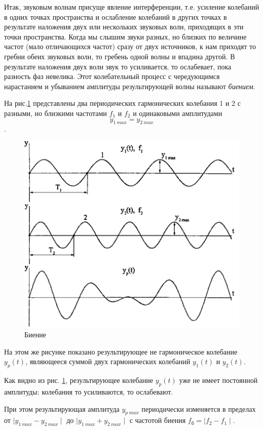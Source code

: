 \documentclass[oneside, final, 14pt]{extreport}
\begin{document}
Итак, звуковым волнам присуще явление интерференции, т.е. усиление колебаний в одних точках пространства и ослабление колебаний в других точках в результате наложения двух или нескольких звуковых волн, приходящих в эти точки пространства. Когда мы слышим звуки разных, но близких по величине частот (мало отличающихся частот) сразу от двух источников, к нам приходят то гребни обеих звуковых волн, то гребень одной волны и впадина другой. В результате наложения двух волн звук то усиливается, то ослабевает, пока разность фаз невелика. Этот колебательный процесс с чередующимся нарастанием и убыванием амплитуды результирующей волны называют {\itshape биением}.

На рис.\ref{pic_interferention_04} представлены два периодических гармонических колебания 1 и 2 с разными, но близкими частотами \(f_1\) и \(f_2\) и одинаковыми амплитудами \[y_{1\:max}=y_{2\:max}\].

\begin{figure}[h]
\centering
\includegraphics{pic-interferention-04}
\caption{Биение}
\label{pic_interferention_04}
\end{figure}

На этом же рисунке показано результирующее не гармоническое колебание \(y_p(t)\), являющееся суммой двух гармонических колебаний \(y_1(t)\) и \(y_2(t)\).

Как видно из рис. \ref{pic_interferention_04}, результирующее колебание \(y_p(t)\) уже не имеет постоянной амплитуды: колебания то усиливаются, то ослабевают.

При этом результирующая амплитуда \(y_{p\:max}\) периодически изменяется в пределах от \(\mid y_{1\:max}-y_{2\:max} \mid\) до \(\mid y_{1\:max}+y_{2\:max} \mid\) с частотой биения \(f_\text{б}=\mid f_2-f_1\mid\).
\end{document}
